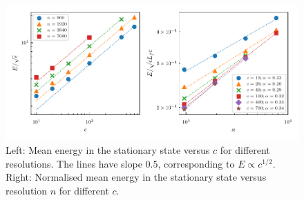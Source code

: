 \documentclass{jfm}
\begin{document}
\begin{figure}
\centerline{\includegraphics[width=5.8in]{../Pyfig/fig_energy_w}}
\caption{Left: Mean energy in the stationary state versus $ c $ for different
resolutions. The lines have slope $ 0.5 $, corresponding to $ E \propto c^{1/2}
$. Right: Normalised mean energy in the stationary state versus resolution $ n
$ for different $ c $.}
\label{MeanE}
\end{figure}
\end{document}
